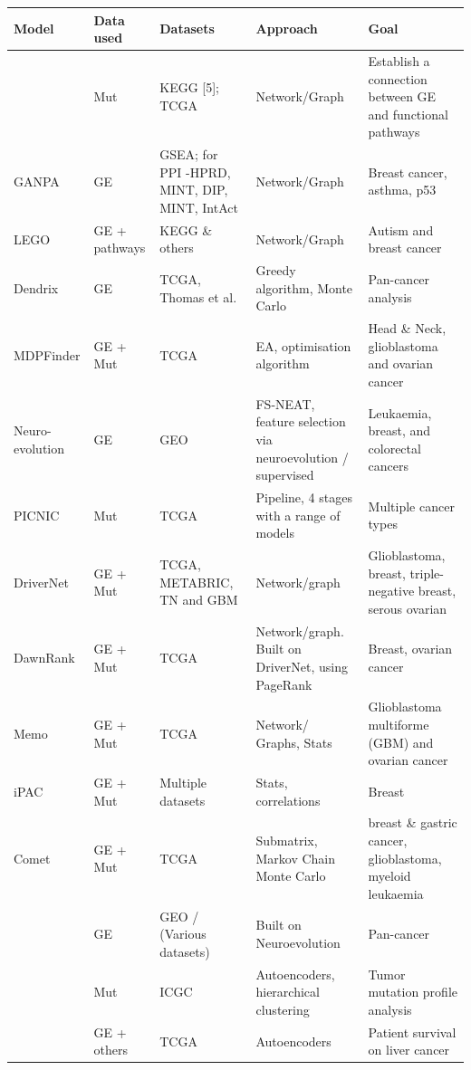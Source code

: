     
{\footnotesize %
\begin{longtable}{|p{3cm}|p{1.8cm}|p{2.2cm}|p{2.8cm}|p{3.5cm}|}
\hline 
\textbf{Model} & \textbf{Data used} & \textbf{Datasets} & \textbf{Approach} & \textbf{Goal} \\ 
\hline 
\endfirsthead

\endlastfoot    
\citet{Cava2018-rv} & Mut & KEGG [5]; TCGA  & Network/Graph & Establish a connection between GE and functional pathways  \\ \hline
GANPA & GE  & GSEA; for PPI -HPRD, MINT, DIP, MINT, IntAct & Network/Graph & Breast cancer, asthma, p53 \\ \hline
LEGO & GE + pathways & KEGG \& others & Network/Graph & Autism and breast cancer \\ \hline
Dendrix & GE & TCGA, Thomas et al. & Greedy algorithm, Monte Carlo & Pan-cancer analysis \\ \hline
MDPFinder & GE + Mut & TCGA & EA, optimisation algorithm & Head \& Neck, glioblastoma and ovarian cancer \\ \hline
Neuro-evolution & GE & GEO & FS-NEAT, feature selection via neuroevolution / supervised & Leukaemia, breast, and colorectal cancers \\ \hline
PICNIC  & Mut & TCGA  & Pipeline, 4 stages with a range of models & Multiple cancer types  \\ \hline
DriverNet & GE + Mut & TCGA, METABRIC, TN and GBM & Network/graph &  Glioblastoma, breast, triple-negative breast, serous ovarian \\ \hline
DawnRank & GE + Mut & TCGA & Network/graph. Built on DriverNet, using PageRank & Breast, ovarian cancer \\ \hline
Memo & GE + Mut & TCGA & Network/ Graphs, Stats & Glioblastoma multiforme (GBM) and ovarian cancer \\ \hline
iPAC & GE + Mut & Multiple datasets & Stats, correlations & Breast \\ \hline
Comet  & GE + Mut & TCGA & Submatrix, Markov Chain Monte Carlo & breast \& gastric cancer, glioblastoma, myeloid leukaemia \\ \hline
\citet{Feltes2019-bd} & GE  & GEO / (Various datasets) & Built on Neuroevolution & Pan-cancer \\ \hline
\citet{Palazzo2019-hx} & Mut & ICGC & Autoencoders, hierarchical clustering & Tumor mutation profile analysis \\ \hline
\citet{Chaudhary2018-qj} & GE + others & TCGA & Autoencoders & Patient survival on liver cancer \\ \hline

\end{longtable}}

